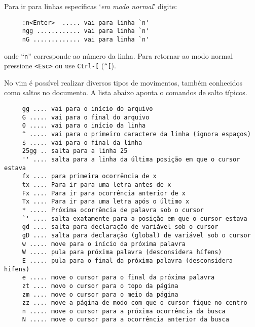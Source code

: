 Para ir para linhas específicas `{\em em modo normal}' digite:
\begin{verbatim}
     :n<Enter>  ..... vai para linha `n'
     ngg ............ vai para linha `n'
     nG ............. vai para linha `n'
\end{verbatim}
onde ``\verb|n|'' corresponde ao número da linha.  Para retornar ao modo normal
pressione \verb|<Esc>| ou use \verb|Ctrl-[| (\verb|^[|).

No vim é possível realizar diversos tipos de movimentos, também conhecidos como saltos no 
documento. A lista abaixo aponta o comandos de salto típicos.
\begin{verbatim}
     gg .... vai para o início do arquivo
     G ..... vai para o final do arquivo
     0 ..... vai para o início da linha
     ^ ..... vai para o primeiro caractere da linha (ignora espaços)
     $ ..... vai para o final da linha
     25gg .. salta para a linha 25
     '' .... salta para a linha da última posição em que o cursor estava
     fx .... para primeira ocorrência de x
     tx .... Para ir para uma letra antes de x
     Fx .... Para ir para ocorrência anterior de x
     Tx .... Para ir para uma letra após o último x
     * ..... Próxima ocorrência de palavra sob o cursor
     `' .... salta exatamente para a posição em que o cursor estava
     gd .... salta para declaração de variável sob o cursor
     gD .... salta para declaração (global) de variável sob o cursor
     w ..... move para o início da próxima palavra
     W ..... pula para próxima palavra (desconsidera hífens)
     E ..... pula para o final da próxima palavra (desconsidera hifens)
     e ..... move o cursor para o final da próxima palavra
     zt .... movo o cursor para o topo da página
     zm .... move o cursor para o meio da página
     zz .... move a página de modo com que o cursor fique no centro
     n ..... move o cursor para a próxima ocorrência da busca
     N ..... move o cursor para a ocorrência anterior da busca
\end{verbatim}

